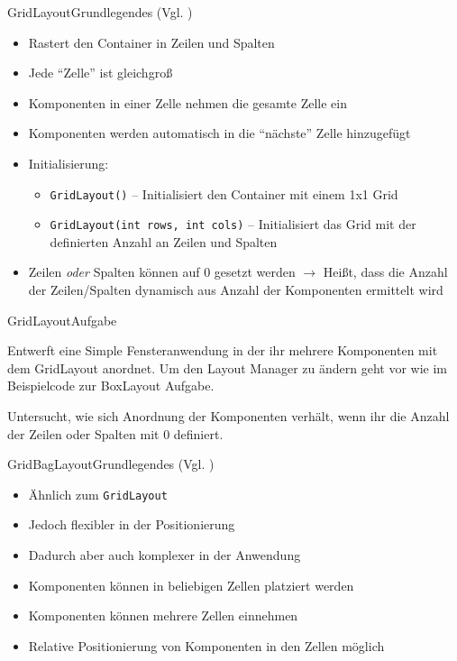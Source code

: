 \begin{frame}{GridLayout}{Grundlegendes (Vgl. \cite{orac:gridlayout})}
    \begin{itemize}
        \item Rastert den Container in Zeilen und Spalten
        \item Jede "`Zelle"' ist gleichgroß
        \item Komponenten in einer Zelle nehmen die gesamte Zelle ein
        \item Komponenten werden automatisch in die "`nächste"' Zelle hinzugefügt
        \item Initialisierung:
        \begin{itemize}
            \item \texttt{GridLayout()} -- Initialisiert den Container mit einem 1x1 Grid
            \item \texttt{GridLayout(int rows, int cols)} -- Initialisiert das Grid mit der definierten Anzahl an Zeilen und Spalten
        \end{itemize}
        \item Zeilen \textit{oder} Spalten können auf $0$ gesetzt werden $\rightarrow$ Heißt, dass die Anzahl der Zeilen/Spalten dynamisch aus Anzahl der Komponenten ermittelt wird
    \end{itemize}
\end{frame}

\begin{frame}{GridLayout}{Aufgabe}
\begin{alertblock}{}
Entwerft eine Simple Fensteranwendung in der ihr mehrere Komponenten mit dem GridLayout anordnet. Um den Layout Manager zu ändern geht vor wie im Beispielcode zur BoxLayout Aufgabe.

Untersucht, wie sich Anordnung der Komponenten verhält, wenn ihr die Anzahl der Zeilen oder Spalten mit $0$ definiert.
\end{alertblock}
\end{frame}

\begin{frame}{GridBagLayout}{Grundlegendes (Vgl. \cite{orac:gridbaglayout})}
    \begin{itemize}
        \item Ähnlich zum \texttt{GridLayout}
        \item Jedoch flexibler in der Positionierung
        \item Dadurch aber auch komplexer in der Anwendung
        \item Komponenten können in beliebigen Zellen platziert werden
        \item Komponenten können mehrere Zellen einnehmen
        \item Relative Positionierung von Komponenten in den Zellen möglich
    \end{itemize}
\end{frame}

